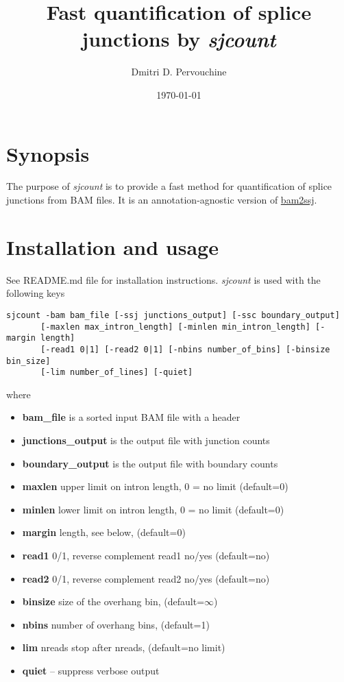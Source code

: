 \documentclass{article}
\begin{document}
\title{Fast quantification of splice junctions by {\em sjcount}}
\author{Dmitri D. Pervouchine}
\date{\today}
\maketitle

\section{Synopsis}

The purpose of {\em sjcount} is to provide a fast method for quantification of splice junctions from BAM files. It is an annotation-agnostic version of 
\href{https://github.com/pervouchine/bam2ssj}{bam2ssj}.


\section{Installation and usage}

See README.md file for installation instructions. {\em sjcount} is used with the following keys

\begin{verbatim}
sjcount -bam bam_file [-ssj junctions_output] [-ssc boundary_output]
       [-maxlen max_intron_length] [-minlen min_intron_length] [-margin length] 
       [-read1 0|1] [-read2 0|1] [-nbins number_of_bins] [-binsize bin_size] 
       [-lim number_of_lines] [-quiet]
\end{verbatim}
where
\begin{itemize}
\item {\bf bam\_file} is a sorted input BAM file with a header
\item {\bf junctions\_output} is the output file with junction counts
\item {\bf boundary\_output} is the output file with boundary counts
\item {\bf maxlen} upper limit on intron length, 0 = no limit (default=0)
\item {\bf minlen} lower limit on intron length, 0 = no limit (default=0)
\item {\bf margin} length, see below, (default=0)
\item {\bf read1} 0/1, reverse complement read1 no/yes (default=no)
\item {\bf read2} 0/1, reverse complement read2 no/yes (default=no)
\item {\bf binsize} size of the overhang bin, (default=$\infty$)
\item {\bf nbins} number of overhang bins, (default=1)
\item {\bf lim} nreads stop after nreads, (default=no limit)
\item {\bf quiet} -- suppress verbose output
\end{itemize}
\end{document}
